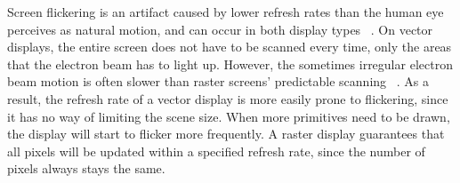 Screen flickering is an artifact caused by lower refresh rates than the human eye perceives as natural motion, and can occur in both display types ~\cite{flicker}.
On vector displays, the entire screen does not have to be scanned every time, only the areas that the electron beam has to light up.
However, the sometimes irregular electron beam motion is often slower than raster screens' predictable scanning ~\cite{vecvsras}.
As a result, the refresh rate of a vector display is more easily prone to flickering, since it has no way of limiting the scene size.
When more primitives need to be drawn, the display will start to flicker more frequently.
A raster display guarantees that all pixels will be updated within a specified refresh rate, since the number of pixels always stays the same.
